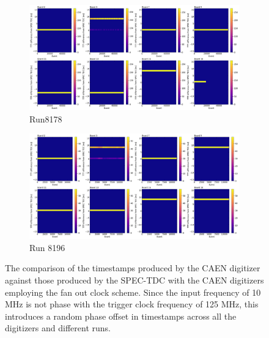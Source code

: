 \begin{figure}[htbp!]
\begin{subfigure}[h]{1.00\linewidth}
\centering    
\includegraphics[width=\linewidth]{TTT_SPEC_diff_run8178}
\caption{Run8178}
\end{subfigure}
\hfill
\begin{subfigure}[h]{1.00\linewidth}
\centering    
\includegraphics[width=\linewidth]{TTT_SPEC_diff_run8196}
\caption{Run 8196}
\end{subfigure}%
\caption{
The comparison of the timestamps produced by the CAEN digitizer against those produced by the SPEC-TDC with the CAEN digitizers employing the fan out clock scheme.
Since the input frequency of 10 MHz is not phase with the trigger clock frequency of 125 MHz, this introduces a random phase offset in timestamps across all the digitizers and different runs. 
}
\label{fig:fanout_spec}
\end{figure}

